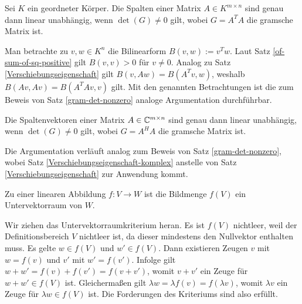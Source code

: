 \begin{Satz}
Sei $K$ ein geordneter Körper. Die Spalten einer Matrix
$A\in K^{m\times n}$ sind genau dann linear unabhängig, wenn
$\det(G)\ne 0$ gilt, wobei $G=A^T A$ die gramsche Matrix ist.
\end{Satz}
\begin{Beweis}
Man betrachte zu $v,w\in K^n$ die Bilinearform $B(v,w):=v^T w$.
Laut Satz \ref{of-sum-of-sq-positive} gilt $B(v,v)>0$ für
$v\ne 0$. Analog zu Satz \ref{Verschiebungseigenschaft} gilt
$B(v,Aw) = B(A^T v,w)$, weshalb $B(Av,Av) = B(A^T A v,v)$  gilt.
Mit den genannten Betrachtungen ist die zum Beweis von Satz
\ref{gram-det-nonzero} analoge Argumentation
durchführbar.\,\qedsymbol
\end{Beweis}

\begin{Satz}
Die Spaltenvektoren einer Matrix $A\in\mathbb C^{m\times n}$ sind
genau dann linear unabhängig, wenn $\det(G)\ne 0$ gilt, wobei
$G=A^H A$ die gramsche Matrix ist.
\end{Satz}
\begin{Beweis}
Die Argumentation verläuft analog zum Beweis von Satz
\ref{gram-det-nonzero}, wobei Satz
\ref{Verschiebungseigenschaft-komplex} anstelle von
Satz \ref{Verschiebungseigenschaft} zur Anwendung kommt.\,\qedsymbol
\end{Beweis}

\begin{Satz}
Zu einer linearen Abbildung $f\colon V\to W$ ist die Bildmenge $f(V)$
ein Untervektorraum von $W$.
\end{Satz}
\begin{Beweis}
Wir ziehen das Untervektorraumkriterium heran. Es ist $f(V)$ nichtleer,
weil der Definitionsbereich $V$ nichtleer ist, da dieser mindestens
den Nullvektor enthalten muss. Es gelte $w\in f(V)$ und $w'\in f(V)$.
Dann existieren Zeugen $v$ mit $w=f(v)$ und $v'$ mit $w'=f(v')$.
Infolge gilt $w+w' = f(v)+f(v') = f(v+v')$, womit $v+v'$ ein
Zeuge für $w+w'\in f(V)$ ist. Gleichermaßen gilt $\lambda w = \lambda f(v)
= f(\lambda v)$, womit $\lambda v$ ein Zeuge für $\lambda w\in f(V)$
ist. Die Forderungen des Kriteriums sind also erfüllt.\,\qedsymbol
\end{Beweis}

